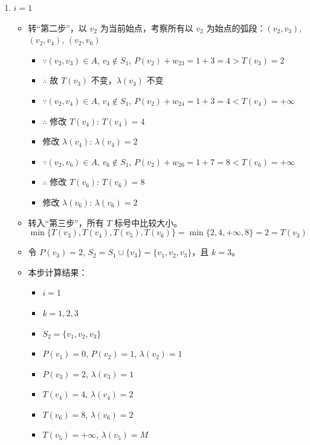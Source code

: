 \begin{enumerate}[label=(\arabic*)]
    \item \( i = 1 \)
    \begin{itemize}
        \item 转“第二步”，以 \( v_2 \) 为当前始点，考察所有以 \( v_2 \) 为始点的弧段：\( (v_2, v_3) \),\( (v_2, v_4) \), \( (v_2, v_6) \)
        \begin{itemize}
            \item \(\because (v_2, v_3) \in A\), \( v_3 \notin S_1 \), \( P(v_2) + w_{23} = 1 + 3 = 4 > T(v_3) = 2 \)
            \item \(\therefore\) 故 \( T(v_3) \) 不变，\( \lambda(v_3) \) 不变
            \item \(\because (v_2, v_4) \in A\), \( v_4 \notin S_1 \), \( P(v_2) + w_{24} = 1 + 3 = 4 < T(v_4) = +\infty \)
            \item \(\therefore\) 修改 \( T(v_4) \): \( T(v_4) = 4 \)
            \item 修改 \( \lambda(v_4) \): \( \lambda(v_4) = 2 \)
            \item \(\because (v_2, v_6) \in A\), \( v_6 \notin S_1 \), \( P(v_2) + w_{26} = 1 + 7 = 8 < T(v_6) = +\infty \)
            \item \(\therefore\) 修改 \( T(v_6) \): \( T(v_6) = 8 \)
            \item 修改 \( \lambda(v_6) \): \( \lambda(v_6) = 2 \)
        \end{itemize}
        \item 转入“第三步”，所有 \( T \) 标号中比较大小。
        \[
        \min\{T(v_3), T(v_4), T(v_5), T(v_6)\} = \min\{2, 4, +\infty, 8\} = 2 = T(v_3)
        \]
        \item 令 \( P(v_3) = 2 \), \( S_2 = S_1 \cup \{v_3\} = \{v_1, v_2, v_3\} \)，且 \( k = 3 \)。
        \item 本步计算结果：
        \begin{itemize}
            \item \( i = 1 \)
            \item \( k = 1, 2, 3 \)
            \item \( S_2 = \{v_1, v_2, v_3\} \)
            \item \( P(v_1) = 0 \), \( P(v_2) = 1 \), \( \lambda(v_2) = 1 \)
            \item \( P(v_3) = 2 \), \( \lambda(v_3) = 1 \)
            \item \( T(v_4) = 4 \), \( \lambda(v_4) = 2 \)
            \item \( T(v_6) = 8 \), \( \lambda(v_6) = 2 \)
            \item \( T(v_5) = +\infty \), \( \lambda(v_5) = M \)
        \end{itemize}
    \end{itemize}


\end{enumerate}
